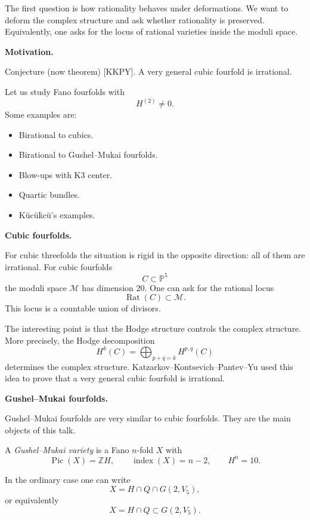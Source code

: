 The first question is how rationality
behaves under deformations.
We want to deform the complex
structure and ask whether rationality
is preserved.
Equivalently, one asks for the locus
of rational varieties inside the
moduli space.

\medskip\noindent
{\bf Motivation.}

Conjecture (now theorem) [KKPY].
A very general cubic fourfold is
irrational.

Let us study Fano fourfolds with
\[
H^{(2)}\neq 0.
\]
Some examples are:
\begin{itemize}
\item Birational to cubics.
\item Birational to Gushel--Mukai
fourfolds.
\item Blow-ups with K3 center.
\item Quartic bundles.
\item K\"uc\"u\"kc\"u's examples.
\end{itemize}

\medskip\noindent
{\bf Cubic fourfolds.}

For cubic threefolds the situation is
rigid in the opposite direction: all
of them are irrational.
For cubic fourfolds
\[
        C\subset \mathbb{P}^5
\]
the moduli space $\mathcal M$ has
dimension $20$.
One can ask for the rational locus
\[
        \operatorname{Rat}(C)
        \subset \mathcal M.
\]
This locus is a countable union of
divisors.

The interesting point is that the
Hodge structure controls the complex
structure.
More precisely, the Hodge
decomposition
\[
        H^k(C)=\bigoplus_{p+q=k}
        H^{p,q}(C)
\]
determines the complex structure.
Katzarkov--Kontsevich--Pantev--Yu
used this idea to prove that a very
general cubic fourfold is irrational.

\medskip\noindent
{\bf Gushel--Mukai fourfolds.}

Gushel--Mukai fourfolds are very
similar to cubic fourfolds.
They are the main objects of this
talk.

\begin{definition}
\label{definition-gushel-mukai}
A {\it Gushel--Mukai variety} is a
Fano $n$-fold $X$ with
\[
        \operatorname{Pic}(X)=
        \mathbb{Z}H,
        \qquad
        \operatorname{index}(X)=n-2,
        \qquad
        H^n=10.
\]
\end{definition}

In the ordinary case one can write
\[
        X=H\cap Q\cap G(2,V_5),
\]
or equivalently
\[
        X=H\cap Q
        \subset G(2,V_5).
\]

